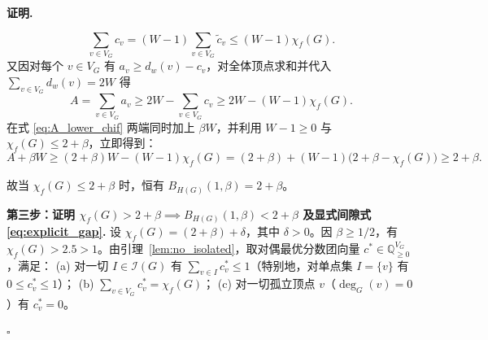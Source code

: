 \documentclass[11pt,a4paper]{ctexart}
\theoremstyle{definition}
\newenvironment{proofcn}{\par\noindent\textbf{证明.}\ }{\hfill$\square$\par}
\newcommand{\Ind}{\mathcal I}
\newcommand{\QQ}{\mathbb Q}
\newcommand{\1}{\boldsymbol 1}
\newcommand{\0}{\boldsymbol 0}
\newcommand{\chif}{\chi_f}
\begin{document}
\begin{proofcn}
\begin{enumerate}[label=(\roman*)]
\[
 \sum_{v\in V_G}c_v = (W-1)\sum_{v\in V_G}\tilde c_v \le (W-1)\chif(G).
\]
又因对每个 $v\in V_G$ 有 $a_v\ge d_w(v)-c_v$，对全体顶点求和并代入 $\sum_{v\in V_G}d_w(v)=2W$ 得
\begin{equation}\label{eq:A_lower_chif}
 A=\sum_{v\in V_G}a_v \ge 2W - \sum_{v\in V_G}c_v \ge 2W - (W-1)\chif(G).
\end{equation}
在式 \eqref{eq:A_lower_chif} 两端同时加上 $\beta W$，并利用 $W-1\ge 0$ 与 $\chif(G)\le 2+\beta$，立即得到：
\begin{equation}\label{eq:cost_lower_bound}
 \boxed{A + \beta W \ge (2+\beta)W - (W-1)\chif(G) = (2+\beta) + (W-1)\bigl(2+\beta-\chif(G)\bigr) \ge 2+\beta.}
\end{equation}
\end{enumerate}
故当 $\chif(G)\le 2+\beta$ 时，恒有 $B_{H(G)}(1,\beta)=2+\beta$。

\medskip
\noindent\textbf{第三步：证明 $\chif(G)>2+\beta \implies B_{H(G)}(1,\beta)<2+\beta$ 及显式间隙式 \eqref{eq:explicit_gap}.}
设 $\chif(G)=(2+\beta)+\delta$，其中 $\delta>0$。因 $\beta\ge 1/2$，有 $\chif(G)>2.5>1$。由引理~\ref{lem:no_isolated}，取对偶最优分数团向量 $c^*\in\QQ_{\ge 0}^{V_G}$，满足：
(a) 对一切 $I\in\Ind(G)$ 有 $\sum_{v\in I}c_v^*\le 1$（特别地，对单点集 $I=\{v\}$ 有 $0\le c_v^*\le 1$）；
(b) $\sum_{v\in V_G}c_v^*=\chif(G)$；
(c) 对一切孤立顶点 $v$（$\deg_G(v)=0$）有 $c_v^*=0$。


\end{proofcn}
\end{document}
